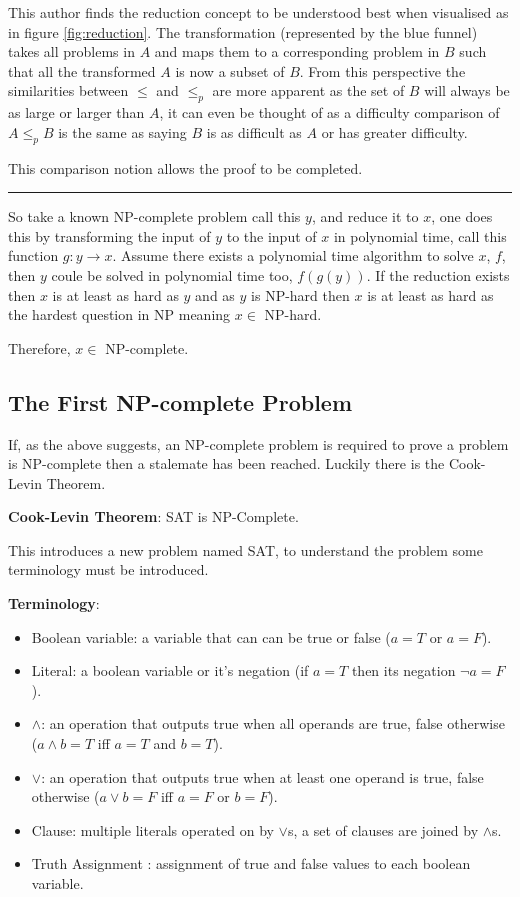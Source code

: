 \documentclass[a4paper,11pt]{report}
\newcounter{row}
\begin{document}
This author finds the reduction concept to be understood best when visualised as in figure \ref{fig:reduction}. The transformation (represented by the blue funnel) takes all problems in $A$ and maps them to a corresponding problem in $B$ such that all the transformed $A$ is now a subset of $B$. From this perspective the similarities between $\leq$ and $\leq_p$ are more apparent as the set of $B$ will always be as large or larger than $A$, it can even be thought of as a difficulty comparison of $A\leq_p B$ is the same as saying $B$ is as difficult as $A$ or has greater difficulty.

This comparison notion allows the proof to be completed.

\noindent\rule{4cm}{0.4pt}

So take a known NP-complete problem call this $y$, and reduce it to $x$, one does this by transforming the input of $y$ to the input of $x$ in polynomial time, call this function $g: y\rightarrow x$. Assume there exists a polynomial time algorithm to solve $x$, $f$, then $y$ coule be solved in polynomial time too, $f(g(y))$. If the reduction exists then $x$ is at least as hard as $y$ and as $y$ is NP-hard then $x$ is at least as hard as the hardest question in NP meaning $x \in$ NP-hard.

Therefore, $x\in $ NP-complete.

\subsection{The First NP-complete Problem} 

If, as the above suggests, an NP-complete problem is required to prove a problem is NP-complete then a stalemate has been reached. Luckily there is the Cook-Levin Theorem.

\textbf{Cook-Levin Theorem}\cite{compcomplexityamodernapproach}: SAT is NP-Complete.

This introduces a new problem named SAT, to understand the problem some terminology must be introduced.

\textbf{Terminology}:
\begin{itemize}
\item Boolean variable: a variable that can can be true or false ($a=T$ or $a=F$).
\item Literal: a boolean variable or it's negation (if $a = T$ then its negation $\neg a = F$).
\item $\land$: an operation that outputs true when all operands are true, false otherwise ($a\land b = T$ iff $a=T$ and $b=T$).
\item $\lor$: an operation that outputs true when at least one operand is true, false otherwise ($a\lor b = F$ iff $a=F$ or $b=F$).
\item Clause: multiple literals operated on by $\lor$s, a set of clauses are joined by $\land$s.
\item Truth Assignment : assignment of true and false values to each boolean variable. 
\end{itemize}
\end{document}
